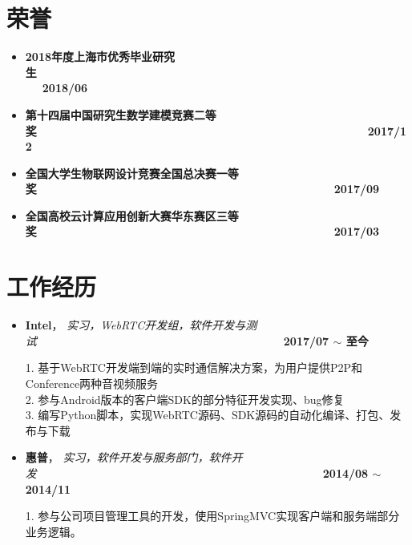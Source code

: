 \documentclass[letterpaper, UTF8, 11pt]{article}
\begin{document}
	\section*{\textbf{荣誉}}\vspace{-0.12in}
	\begin{itemize}
		\item \textbf{2018年度上海市优秀毕业研究生}~~~~~~~~~~~~~~~~~~~~~~~~~~~~~~~~~~~~~~~~~~~~~~~~~~~~~~~~~~~~~~~~~~~~~\textbf{2018/06}
		\item \textbf{第十四届中国研究生数学建模竞赛二等奖}~~~~~~~~~~~~~~~~~~~~~~~~~~~~~~~~~~~~~~~~~~~~~~~~~~~~~~~~~~~\textbf{2017/12}
		\item \textbf{全国大学生物联网设计竞赛全国总决赛一等奖}~~~~~~~~~~~~~~~~~~~~~~~~~~~~~~~~~~~~~~~~~~~~~~~~~~~~~\textbf{2017/09}
		\item \textbf{全国高校云计算应用创新大赛华东赛区三等奖}~~~~~~~~~~~~~~~~~~~~~~~~~~~~~~~~~~~~~~~~~~~~~~~~~~~~~\textbf{2017/03}
	\end{itemize}
	\vspace{-0.32in}
	
	\section*{\textbf{工作经历}}\vspace{-0.12in}
	\begin{itemize}
		\item \textbf{Intel}， \emph{实习，WebRTC开发组，软件开发与测试}~~~~~~~~~~~~~~~~~~~~~~~~~~~~~~~~~~~~~~~~~~~~\textbf{2017/07 $\sim$ 至今}
		
		1. 基于WebRTC开发端到端的实时通信解决方案，为用户提供P2P和Conference两种音视频服务\\
		2. 参与Android版本的客户端SDK的部分特征开发实现、bug修复\\
		3. 编写Python脚本，实现WebRTC源码、SDK源码的自动化编译、打包、发布与下载
		\item \textbf{惠普}， \emph{实习，软件开发与服务部门，软件开发}~~~~~~~~~~~~~~~~~~~~~~~~~~~~~~~~~~~~~~~~~~~~~~~~~~~\textbf{2014/08 $\sim$ 2014/11}
		
		1. 参与公司项目管理工具的开发，使用SpringMVC实现客户端和服务端部分业务逻辑。
	\end{itemize}
	\vspace{-0.32in}
	
\end{document}
